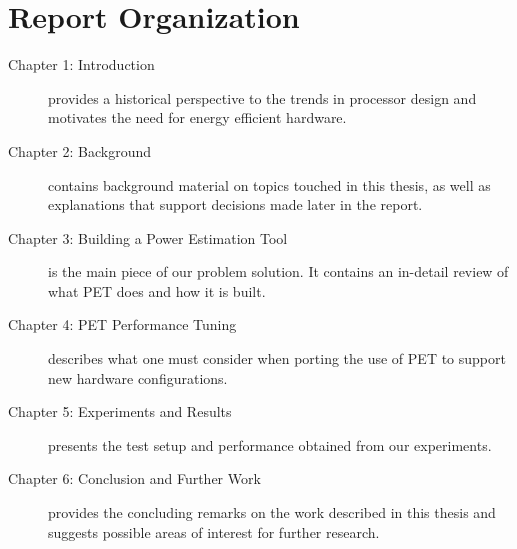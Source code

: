 \section{Report Organization}


\begin{description}
    \item[Chapter 1: Introduction] provides a historical perspective to the
        trends in processor design and motivates the need for energy efficient
        hardware.
    \item[Chapter 2: Background] contains background material on topics touched
        in this thesis, as well as explanations that support decisions made
        later in the report.
    \item[Chapter 3: Building a Power Estimation Tool] is the main piece of our
        problem solution. It contains an in-detail review of what PET does and
        how it is built.
    \item[Chapter 4: PET Performance Tuning] describes what one must consider
        when porting the use of PET to support new hardware configurations.
    \item[Chapter 5: Experiments and Results] presents the test setup and
        performance obtained from our experiments.
    \item[Chapter 6: Conclusion and Further Work] provides the concluding remarks on the work
        described in this thesis and suggests possible areas of interest for
        further research.
\end{description}

